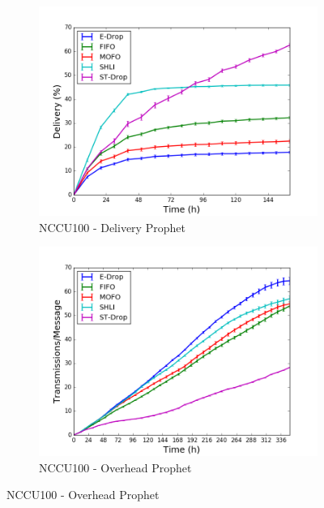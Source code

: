 \begin{figure}
    \begin{subfigure}[b]{0.5\columnwidth}
        \includegraphics[width=\linewidth]{imgs/nccu/100/Prophet-delivery.png}
        \caption{NCCU100 - Delivery Prophet}
        \label{fig:nccu100ProphetDel}
    \end{subfigure}
    \begin{subfigure}[b]{0.5\columnwidth}
        \includegraphics[width=\linewidth]{imgs/nccu/100/Prophet-overhead.png}
        \caption{NCCU100 - Overhead Prophet}
        \label{fig:nccu100ProphetOver}
    \end{subfigure}


\end{figure}
